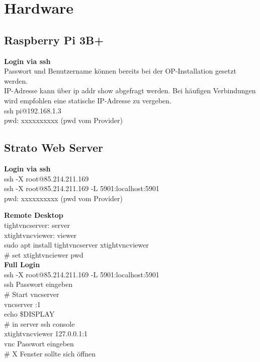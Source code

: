 \newpage
\section{Hardware}

\subsection{Raspberry Pi 3B+}
\textbf{Login via ssh}\\
Passwort und Benutzername können bereits bei der OP-Installation gesetzt werden.\\
IP-Adresse kann über ip addr show abgefragt werden. Bei häufigen Verbindungen wird empfohlen 
eine statische IP-Adresse zu vergeben.\\
ssh pi@192.168.1.3\\
pwd: xxxxxxxxxx (pwd vom Provider)

\subsection{Strato Web Server}
\textbf{Login via ssh}\\
ssh -X root@85.214.211.169\\
ssh -X root@85.214.211.169 -L 5901:localhost:5901\\
pwd: xxxxxxxxxx (pwd vom Provider)

\textbf{Remote Desktop}\\
tightvncserver: server\\
xtightvncviewer: viewer\\
sudo apt install tightvncserver xtightvncviewer\\
\# set xtightvnciewer pwd\\

\textbf{Full Login}\\
ssh -X root@85.214.211.169 -L 5901:localhost:5901\\
ssh Passwort eingeben\\
\# Start vncserver\\
vncserver :1\\
echo \grqq{}\$DISPLAY\grqq{}\\
\# in server ssh console\\
xtightvncviewer 127.0.0.1:1\\
vnc Passwort eingeben\\
\# X Fenster sollte sich öffnen


